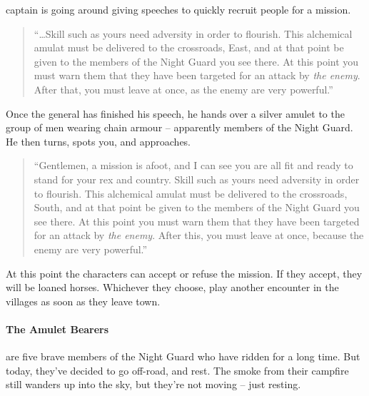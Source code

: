 \begin{multicols}{2}

\Gls{captain} is going around giving speeches to quickly recruit people for a mission.

\begin{boxtext}

	\begin{quotation}

		``\ldots Skill such as yours need adversity in order to flourish.  This alchemical amulat must be delivered to the crossroads, East, and at that point be given to the members of the Night Guard you see there.
		At this point you must warn them that they have been targeted for an attack by \emph{the enemy}.
		After that, you must leave at once, as the enemy are very powerful.''

	\end{quotation}

	Once the general has finished his speech, he hands over a silver amulet to the group of men wearing chain armour -- apparently members of the Night Guard.
	He then turns, spots you, and approaches.

	\begin{quotation}

		``Gentlemen, a mission is afoot, and I can see you are all fit and ready to stand for your rex and country.
		Skill such as yours need adversity in order to flourish.
		This alchemical amulat must be delivered to the crossroads, South, and at that point be given to the members of the Night Guard you see there.
		At this point you must warn them that they have been targeted for an attack by \emph{the enemy}.
		After this, you must leave at once, because the enemy are very powerful.''

	\end{quotation}

\end{boxtext}

At this point the characters can accept or refuse the mission.  If they accept, they will be loaned horses.  Whichever they choose, play another encounter in the villages as soon as they leave town.

\paragraph{The Amulet Bearers} are five brave members of the Night Guard who have ridden for a long time.  But today, they've decided to go off-road, and rest.  The smoke from their campfire still wanders up into the sky, but they're not moving -- just resting.


\end{multicols}
